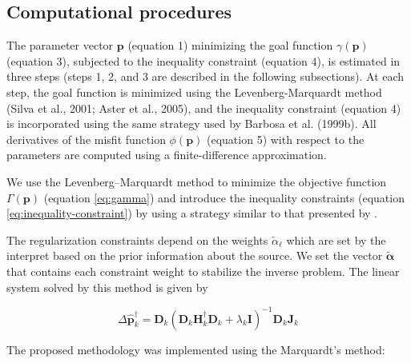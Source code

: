 \subsection{Computational procedures}

The parameter vector $\mathbf{p}$ (equation 1) minimizing the goal function $\gamma(\mathbf{p})$ (equation 3), subjected to the inequality constraint (equation 4), is estimated in three steps (steps 1, 2, and 3 are described in the following subsections). At each step, the goal function is minimized using the Levenberg-Marquardt method (Silva et al., 2001; Aster et al., 2005), and the inequality constraint (equation 4) is incorporated using the same strategy used by Barbosa et al. (1999b). All derivatives of the misfit function $\phi(\mathbf{p})$ (equation 5) with respect to the parameters are computed using a finite-difference approximation.

We use the Levenberg–Marquardt method \citep[][ p. 240]{aster-etal2019} to minimize the objective function 
$\Gamma (\mathbf{p})$ (equation \ref{eq:gamma}) and introduce the inequality constraints 
(equation \ref{eq:inequality-constraint}) by using a strategy similar to that presented by \cite{barbosa-etal1999}.

The regularization constraints depend on the weights $\tilde{\alpha}_\ell$ which are set by the interpret based on the prior information about the source. We set the vector $\tilde{\boldsymbol{\alpha}}$ that contains each constraint weight to stabilize the inverse problem. The linear system solved by this method is given by

\begin{equation}\label{eq:linear-system}
\Delta\hat{\mathbf{p}}^{\dagger}_k = \mathbf{D}_k\left(\mathbf{D}_k\mathbf{H}^\dagger_k\mathbf{D}_k+\lambda_k\mathbf{I}\right)^{-1}\mathbf{D}_k\mathbf{J}_k
\end{equation}


The proposed methodology was implemented using the Marquardt's method:

